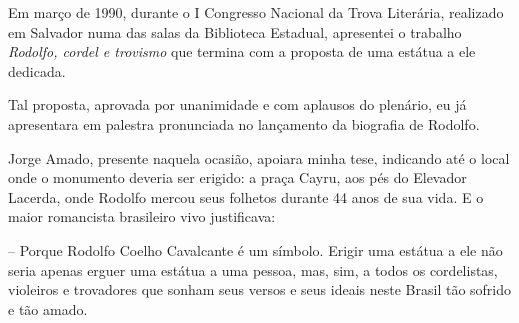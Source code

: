  Em março de 1990, durante o I Congresso Nacional da Trova Literária,
realizado em Salvador numa das salas da Biblioteca Estadual, apresentei
o trabalho \textit{Rodolfo, cordel e trovismo} que termina com a
proposta de uma estátua a ele dedicada. 

 Tal proposta, aprovada por unanimidade e com aplausos do plenário, eu
já apresentara em palestra pronunciada no lançamento da biografia de
Rodolfo. 

 Jorge Amado, presente naquela ocasião, apoiara minha tese, indicando
até o local onde o monumento deveria ser erigido: a praça Cayru, aos
pés do Elevador Lacerda, onde Rodolfo mercou seus folhetos durante 44
anos de sua vida. E o maior romancista brasileiro vivo justificava: 

 -- Porque Rodolfo Coelho Cavalcante é um símbolo. Erigir uma estátua
a ele não seria apenas erguer uma estátua a uma pessoa, mas, sim, a
todos os cordelistas, violeiros e trovadores que sonham seus versos e
seus ideais neste Brasil tão sofrido e tão amado. 


